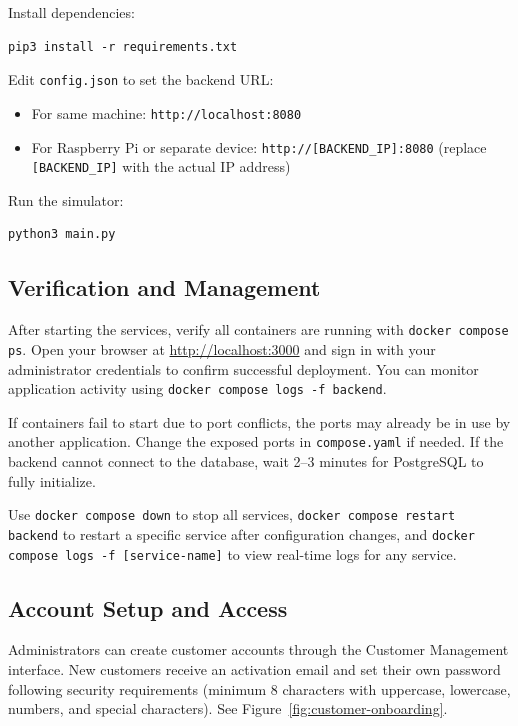 Install dependencies:
\begin{verbatim}
pip3 install -r requirements.txt
\end{verbatim}

Edit \texttt{config.json} to set the backend URL:
\begin{itemize}
    \item For same machine: \texttt{http://localhost:8080}
    \item For Raspberry Pi or separate device: \texttt{http://[BACKEND\_IP]:8080} (replace \texttt{[BACKEND\_IP]} with the actual IP address)
\end{itemize}

Run the simulator:
\begin{verbatim}
python3 main.py
\end{verbatim}

\subsection{Verification and Management}
\label{subsec:verification}

After starting the services, verify all containers are running with \texttt{docker compose ps}. Open your browser at \url{http://localhost:3000} and sign in with your administrator credentials to confirm successful deployment. You can monitor application activity using \texttt{docker compose logs -f backend}.

If containers fail to start due to port conflicts, the ports may already be in use by another application. Change the exposed ports in \texttt{compose.yaml} if needed. If the backend cannot connect to the database, wait 2--3 minutes for PostgreSQL to fully initialize.

Use \texttt{docker compose down} to stop all services, \texttt{docker compose restart backend} to restart a specific service after configuration changes, and \texttt{docker compose logs -f [service-name]} to view real-time logs for any service.

\subsection{Account Setup and Access}
\label{subsec:account-setup}

Administrators can create customer accounts through the Customer Management interface. New customers receive an activation email and set their own password following security requirements (minimum 8 characters with uppercase, lowercase, numbers, and special characters). See Figure~\ref{fig:customer-onboarding}.


